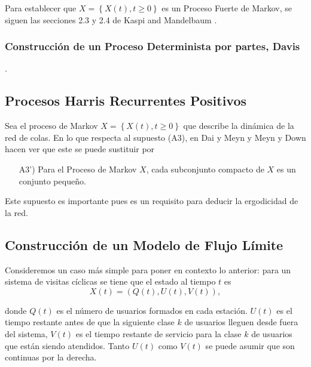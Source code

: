 Para establecer que $X=\left\{X\left(t\right),t\geq0\right\}$ es
un Proceso Fuerte de Markov, se siguen las secciones 2.3 y 2.4 de Kaspi and Mandelbaum \cite{KaspiMandelbaum}. \\

\subsubsection{Construcci\'on de un Proceso Determinista por partes, Davis
\cite{Davis}}.

\subsection{Procesos Harris Recurrentes Positivos}
Sea el proceso de Markov $X=\left\{X\left(t\right),t\geq0\right\}$
que describe la din\'amica de la red de colas. En lo que respecta
al supuesto (A3), en Dai y Meyn \cite{DaiSean} y Meyn y Down
\cite{MeynDown} hacen ver que este se puede sustituir por

\begin{itemize}
\item[A3')] Para el Proceso de Markov $X$, cada subconjunto
compacto de $X$ es un conjunto peque\~no.
\end{itemize}

Este supuesto es importante pues es un requisito para deducir la ergodicidad de la red.

\subsection{Construcci\'on de un Modelo de Flujo L\'imite}

Consideremos un caso m\'as simple para poner en contexto lo
anterior: para un sistema de visitas c\'iclicas se tiene que el
estado al tiempo $t$ es
\begin{equation}
X\left(t\right)=\left(Q\left(t\right),U\left(t\right),V\left(t\right)\right),
\end{equation}

donde $Q\left(t\right)$ es el n\'umero de usuarios formados en
cada estaci\'on. $U\left(t\right)$ es el tiempo restante antes de
que la siguiente clase $k$ de usuarios lleguen desde fuera del
sistema, $V\left(t\right)$ es el tiempo restante de servicio para
la clase $k$ de usuarios que est\'an siendo atendidos. Tanto
$U\left(t\right)$ como $V\left(t\right)$ se puede asumir que son
continuas por la derecha.

